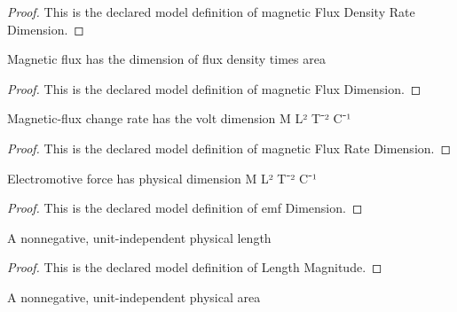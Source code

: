 \begin{proof}
  This is the declared model definition of magnetic Flux Density Rate Dimension.
\end{proof}
\begin{definition}
  \label{def:physics:phyx-mini-0926:phyxminiproblems-problemphyxmini0926-magneticfluxdimension}
  Magnetic flux has the dimension of flux density times area
\end{definition}
\begin{proof}
  This is the declared model definition of magnetic Flux Dimension.
\end{proof}
\begin{definition}
  \label{def:physics:phyx-mini-0926:phyxminiproblems-problemphyxmini0926-magneticfluxratedimension}
  Magnetic-flux change rate has the volt dimension M L² T⁻² C⁻¹
\end{definition}
\begin{proof}
  This is the declared model definition of magnetic Flux Rate Dimension.
\end{proof}
\begin{definition}
  \label{def:physics:phyx-mini-0926:phyxminiproblems-problemphyxmini0926-emfdimension}
  Electromotive force has physical dimension M L² T⁻² C⁻¹
\end{definition}
\begin{proof}
  This is the declared model definition of emf Dimension.
\end{proof}
\begin{definition}
  \label{def:physics:phyx-mini-0926:phyxminiproblems-problemphyxmini0926-lengthmagnitude}
  A nonnegative, unit-independent physical length
\end{definition}
\begin{proof}
  This is the declared model definition of Length Magnitude.
\end{proof}
\begin{definition}
  \label{def:physics:phyx-mini-0926:phyxminiproblems-problemphyxmini0926-areamagnitude}
  A nonnegative, unit-independent physical area
\end{definition}
